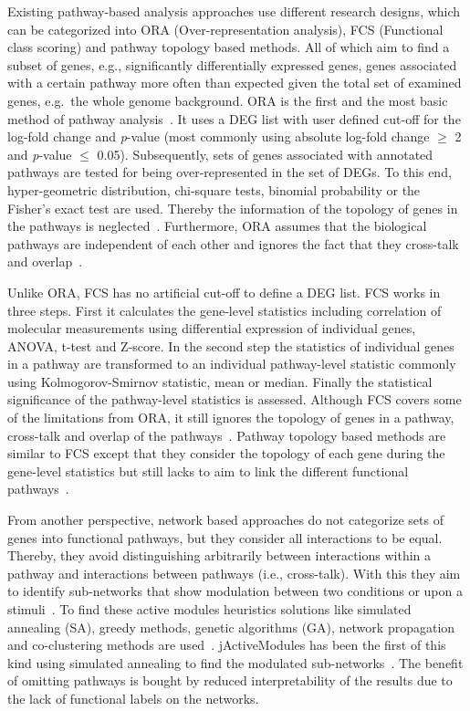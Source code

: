 \documentclass[10pt,a4paper,twocolumn]{article}
\begin{document}
	
	Existing pathway-based analysis approaches use different research
	designs, which can be categorized into ORA (Over-representation
	analysis), FCS (Functional class scoring) and pathway topology based
	methods. All of which aim to find a subset of genes, e.g.,
	significantly differentially expressed genes, genes associated with a
	certain pathway more often than expected given the total set of
	examined genes, e.g.~the whole genome background. ORA is
	the first and the most basic method of pathway analysis~\cite{Campos}. It uses a
	DEG list with user defined cut-off for the log-fold change and
	\textit{p}-value (most commonly using absolute log-fold change $\geq$
	2 and \textit{p}-value $\leq$ 0.05). Subsequently, sets of genes
	associated with annotated pathways are tested for being
	over-represented in the set of DEGs. To this end, hyper-geometric
	distribution, chi-square tests, binomial probability or the Fisher’s
	exact test are used. Thereby the information of the topology of genes
	in the pathways is neglected~\cite{Bayer}. Furthermore, ORA assumes
	that the biological pathways are independent of each other and ignores
	the fact that they cross-talk and overlap~\cite{Khatri2012,Campos}.
	
	Unlike ORA, FCS has no artificial cut-off to define a DEG list. FCS works in
	three steps. First it calculates the gene-level statistics including
	correlation of molecular measurements using differential expression of
	individual genes, ANOVA, t-test and Z-score. In the second step the
	statistics of individual genes in a pathway are transformed to an
	individual pathway-level statistic commonly using Kolmogorov-Smirnov
	statistic, mean or median. Finally the statistical significance of the
	pathway-level statistics is assessed. Although FCS covers some of the
	limitations from ORA, it still ignores the topology of genes in a pathway,
	cross-talk and overlap of the pathways~\cite{Khatri2012,Campos}. Pathway
	topology based methods are similar to FCS except that they consider the
	topology of each gene during the gene-level statistics but still lacks to aim
	to link the different functional pathways~\cite{Khatri2012}.
	
	From another perspective, network based approaches do not categorize sets of genes into functional pathways, but they consider all interactions to be equal. Thereby, they avoid distinguishing arbitrarily between interactions within a pathway and interactions between pathways (i.e., cross-talk). With this they aim to identify sub-networks that show modulation between two conditions or upon a stimuli~\cite{mitra_carvunis_ramesh_ideker_2013}. To find these active modules heuristics solutions like simulated annealing (SA), greedy methods, genetic algorithms (GA), network propagation and co-clustering methods are used~\cite{mitra_carvunis_ramesh_ideker_2013}. jActiveModules has been the first of this kind using simulated annealing to find the modulated sub-networks~\cite{jActiveModules}. The benefit of omitting pathways is bought by reduced interpretability of the results due to the lack of functional labels on the networks. 
		
\end{document}
